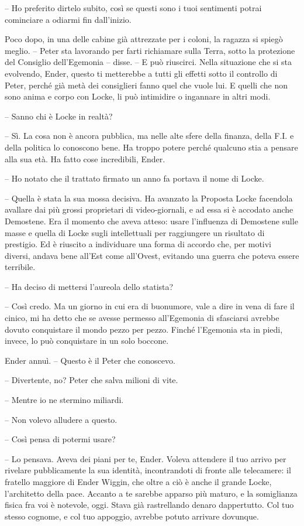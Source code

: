 {-- Ho preferito dirtelo subito, così se questi sono i tuoi sentimenti
	potrai cominciare a odiarmi fin dall'inizio.}

{Poco dopo, in una delle cabine già attrezzate per i coloni, la ragazza
	si spiegò meglio. -- Peter sta lavorando per farti richiamare sulla
	Terra, sotto la protezione del Consiglio dell'Egemonia -- disse. -- E
	può riuscirci. Nella situazione che si sta evolvendo, Ender, questo ti
	metterebbe a tutti gli effetti sotto il controllo di Peter, perché già
	metà dei consiglieri fanno quel che vuole lui. E quelli che non sono
	anima e corpo con Locke, li può intimidire o ingannare in altri modi.}

{-- Sanno chi è Locke in realtà?}

{-- Sì. La cosa non è ancora pubblica, ma nelle alte sfere della
	finanza, della F.I. e della politica lo conoscono bene. Ha troppo potere
	perché qualcuno stia a pensare alla sua età. Ha fatto cose incredibili,
	Ender.}

{-- Ho notato che il trattato firmato un anno fa portava il nome di
	Locke.}

{-- Quella è stata la sua mossa decisiva. Ha avanzato la Proposta Locke
	facendola avallare dai più grossi proprietari di video-giornali, e ad
	essa si è accodato anche Demostene. Era il momento che aveva atteso:
	usare l'influenza di Demostene sulle masse e quella di Locke sugli
	intellettuali per raggiungere un risultato di prestigio. Ed è riuscito a
	individuare una forma di accordo che, per motivi diversi, andava bene
	all'Est come all'Ovest, evitando una guerra che poteva essere
	terribile.}

{-- Ha deciso di mettersi l'aureola dello statista?}

{-- Così credo. Ma un giorno in cui era di buonumore, vale a dire in
	vena di fare il cinico, mi ha detto che se avesse permesso all'Egemonia
	di sfasciarsi avrebbe dovuto conquistare il mondo pezzo per pezzo.
	Finché l'Egemonia sta in piedi, invece, lo può conquistare in un solo
	boccone.}

{Ender annuì. -- Questo è il Peter che conoscevo.}

{-- Divertente, no? Peter che salva milioni di vite.}

{-- Mentre io ne stermino miliardi.}

{-- Non volevo alludere a questo.}

{-- Così pensa di potermi usare?}

{-- Lo pensava. Aveva dei piani per te, Ender. Voleva attendere il tuo
	arrivo per rivelare pubblicamente la sua identità, incontrandoti di
	fronte alle telecamere: il fratello maggiore di Ender Wiggin, che oltre
	a ciò è anche il grande Locke, l'architetto della pace. Accanto a te
	sarebbe apparso più maturo, e la somiglianza fisica fra voi è notevole,
	oggi. Stava già rastrellando denaro dappertutto. Col tuo stesso cognome,
	e col tuo appoggio, avrebbe potuto arrivare dovunque.}

